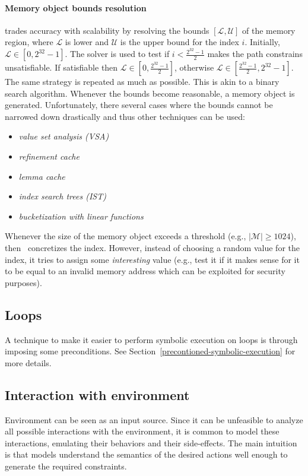 \documentclass[10pt, a4paper]{article}
\begin{document}
\paragraph{Memory object bounds resolution} \cite{MAYHEM-SP12} trades accuracy with scalability by resolving the bounds $[\mathcal{L}, \mathcal{U}]$ of the memory region, where $\mathcal{L}$ is lower and $\mathcal{U}$ is the upper bound for the index $i$. Initially, $\mathcal{L} \in [0, 2^{32}-1]$. The solver is used to test if $i < \frac{2^{32}-1}{2}$ makes the path constrains unsatisfiable. If satisfiable then $\mathcal{L} \in [0, \frac{2^{32}-1}{2}]$, otherwise $\mathcal{L} \in [\frac{2^{32}-1}{2}, 2^{32}-1]$. The same strategy is repeated as much as possible. This is akin to a binary search algorithm. Whenever the bounds become reasonable, a memory object is generated. Unfortunately, there several cases where the bounds cannot be narrowed down drastically and thus other techniques can be used:
\begin{itemize}
  \item {\em value set analysis (VSA)}
  \item {\em refinement cache}
  \item {\em lemma cache}
  \item {\em index search trees (IST)}
  \item {\em bucketization with linear functions}
\end{itemize}
Whenever the size of the memory object exceeds a threshold (e.g., $|\mathcal{M}| \geq 1024$), then~\cite{MAYHEM-SP12} concretizes the index. However, instead of choosing a random value for the index, it tries to assign some {\em interesting} value (e.g., test it if it makes sense for it to be equal to an invalid memory address which can be exploited for security purposes).

\subsection{Loops}

A technique to make it easier to perform symbolic execution on loops is through imposing some preconditions. See Section~\ref{precontioned-symbolic-execution} for more details.

\subsection{Interaction with environment}

Environment can be seen as an input source. Since it can be unfeasible to analyze all possible interactions with the environment, it is common to model these interactions, emulating their behaviors and their side-effects. The main intuition is that models understand the semantics of the desired actions well enough to generate the required constraints.\\
\end{document}
